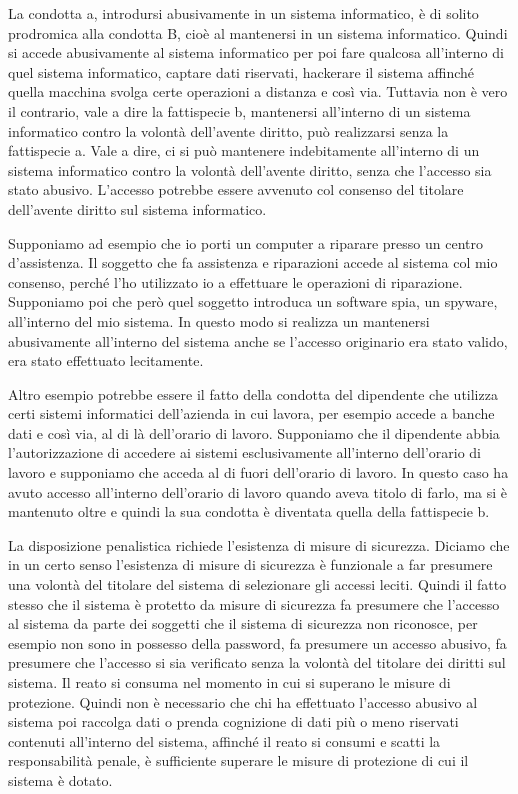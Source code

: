 La condotta a, introdursi abusivamente in un sistema informatico, è di solito prodromica alla condotta B, cioè al mantenersi in un sistema informatico. Quindi si accede abusivamente al sistema informatico per poi fare qualcosa all'interno di quel sistema informatico, captare dati riservati, hackerare il sistema affinché quella macchina svolga certe operazioni a distanza e così via. Tuttavia non è vero il contrario, vale a dire la fattispecie b, mantenersi all'interno di un sistema informatico contro la volontà dell'avente diritto, può realizzarsi senza la fattispecie a. Vale a dire, ci si può mantenere indebitamente all'interno di un sistema informatico contro la volontà dell'avente diritto, senza che l'accesso sia stato abusivo. L'accesso potrebbe essere avvenuto col consenso del titolare dell'avente diritto sul sistema informatico. 

Supponiamo ad esempio che io porti un computer a riparare presso un centro d'assistenza. Il soggetto che fa assistenza e riparazioni accede al sistema col mio consenso, perché l'ho utilizzato io a effettuare le operazioni di riparazione. Supponiamo poi che però quel soggetto introduca un software spia, un spyware, all'interno del mio sistema. In questo modo si realizza un mantenersi abusivamente all'interno del sistema anche se l'accesso originario era stato valido, era stato effettuato lecitamente. 

Altro esempio potrebbe essere il fatto della condotta del dipendente che utilizza certi sistemi informatici dell'azienda in cui lavora, per esempio accede a banche dati e così via, al di là dell'orario di lavoro. Supponiamo che il dipendente abbia l'autorizzazione di accedere ai sistemi esclusivamente all'interno dell'orario di lavoro e supponiamo che acceda al di fuori dell'orario di lavoro. In questo caso ha avuto accesso all'interno dell'orario di lavoro quando aveva titolo di farlo, ma si è mantenuto oltre e quindi la sua condotta è diventata quella della fattispecie b. 

La disposizione penalistica richiede l'esistenza di misure di sicurezza. Diciamo che in un certo senso l'esistenza di misure di sicurezza è funzionale a far presumere una volontà del titolare del sistema di selezionare gli accessi leciti. Quindi il fatto stesso che il sistema è protetto da misure di sicurezza fa presumere che l'accesso al sistema da parte dei soggetti che il sistema di sicurezza non riconosce, per esempio non sono in possesso della password, fa presumere un accesso abusivo, fa presumere che l'accesso si sia verificato senza la volontà del titolare dei diritti sul sistema. 
Il reato si consuma nel momento in cui si superano le misure di protezione. Quindi non è necessario che chi ha effettuato l'accesso abusivo al sistema poi raccolga dati o prenda cognizione di dati più o meno riservati contenuti all'interno del sistema, affinché il reato si consumi e scatti la responsabilità penale, è sufficiente superare le misure di protezione di cui il sistema è dotato. 

